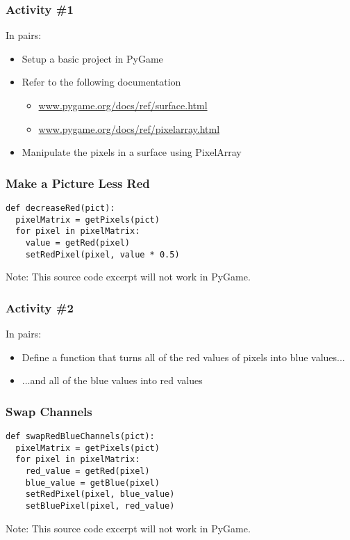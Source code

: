 \begin{frame}
	\frametitle{Activity \#1}
	
	In pairs:
	
	\vspace{2em}
	
	\begin{itemize}		
		\item Setup a basic project in PyGame
		\item Refer to the following documentation
		\begin{itemize}
			\item \url{www.pygame.org/docs/ref/surface.html}
			\item \url{www.pygame.org/docs/ref/pixelarray.html}
		\end{itemize}
		\item Manipulate the pixels in a surface using PixelArray
	\end{itemize}
\end{frame}

\begin{frame}[fragile]
	\frametitle{Make a Picture Less Red}
	
\begin{lstlisting}
def decreaseRed(pict):
  pixelMatrix = getPixels(pict)
  for pixel in pixelMatrix:
    value = getRed(pixel)
    setRedPixel(pixel, value * 0.5)
\end{lstlisting}

Note: This source code excerpt will not work in PyGame.

\end{frame}

\begin{frame}
	\frametitle{Activity \#2}
	
	In pairs:
	
	\vspace{2em}
	
	\begin{itemize}
		\item Define a function that turns all of the red values of pixels into blue values...
		\item ...and all of the blue values into red values
	\end{itemize}
\end{frame}

\begin{frame}[fragile]
	\frametitle{Swap Channels}
	
\begin{lstlisting}
def swapRedBlueChannels(pict):
  pixelMatrix = getPixels(pict)
  for pixel in pixelMatrix:
    red_value = getRed(pixel)
    blue_value = getBlue(pixel)
    setRedPixel(pixel, blue_value)
    setBluePixel(pixel, red_value)
\end{lstlisting}

Note: This source code excerpt will not work in PyGame.

\end{frame}

